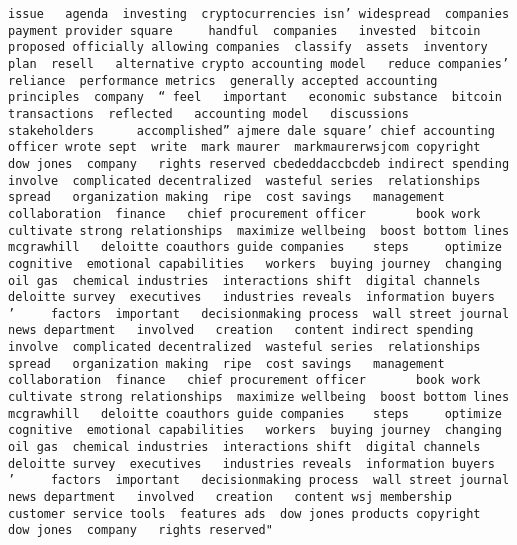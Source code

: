 \documentclass[
]{article}
\begin{document}
\begin{verbatim}
issue   agenda  investing  cryptocurrencies isn’ widespread  companies    payment provider square     handful  companies   invested  bitcoin proposed officially allowing companies  classify  assets  inventory   plan  resell   alternative crypto accounting model   reduce companies’ reliance  performance metrics  generally accepted accounting principles  company  “ feel   important   economic substance  bitcoin transactions  reflected   accounting model   discussions   stakeholders      accomplished” ajmere dale square’ chief accounting officer wrote sept  write  mark maurer  markmaurerwsjcom copyright  dow jones  company   rights reserved cbededdaccbcdeb indirect spending  involve  complicated decentralized  wasteful series  relationships spread   organization making  ripe  cost savings   management  collaboration  finance   chief procurement officer       book work     cultivate strong relationships  maximize wellbeing  boost bottom lines mcgrawhill   deloitte coauthors guide companies    steps     optimize  cognitive  emotional capabilities   workers  buying journey  changing   oil gas  chemical industries  interactions shift  digital channels  deloitte survey  executives   industries reveals  information buyers   ’     factors  important   decisionmaking process  wall street journal news department   involved   creation   content indirect spending  involve  complicated decentralized  wasteful series  relationships spread   organization making  ripe  cost savings   management  collaboration  finance   chief procurement officer       book work     cultivate strong relationships  maximize wellbeing  boost bottom lines mcgrawhill   deloitte coauthors guide companies    steps     optimize  cognitive  emotional capabilities   workers  buying journey  changing   oil gas  chemical industries  interactions shift  digital channels  deloitte survey  executives   industries reveals  information buyers   ’     factors  important   decisionmaking process  wall street journal news department   involved   creation   content wsj membership customer service tools  features ads  dow jones products copyright   dow jones  company   rights reserved"                                                                                                                                                                                                                                                                                                                                                                                                                                                                                                                                                                                                                                                                                                                                                                                                                                                                                                                                                                                                                                                                                                                                                                                                
\end{verbatim}
\end{document}
